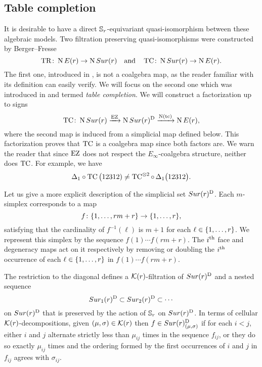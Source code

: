 
\subsection{Table completion}\label{ss:table completion}

It is desirable to have a direct $\mathbb{S}_r$-equivariant quasi-isomorphism between these algebraic models.
Two filtration preserving quasi-isomorphisms were constructed by Berger--Fresse
\[
\operatorname{TR} \colon \operatorname{N}E(r) \to \operatorname{N}Sur(r)
\quad \text{and} \quad
\operatorname{TC} \colon \operatorname{N}Sur(r) \to \operatorname{N} E(r).
\]
The first one, introduced in \cite[1$\cdot$3]{berger2004combinatorial}, is not a coalgebra map, as the reader familiar with its definition can easily verify.
We will focus on the second one which was introduced in \cite{berger2002prismatic} and termed \textit{table completion}.
We will construct a factorization up to signs
\[
\operatorname{TC} \colon \operatorname{N}Sur(r) \xrightarrow{\operatorname{EZ}} \operatorname{N}Sur(r)^{\mathrm{D}} \xrightarrow{\operatorname{N}(\operatorname{tc})} \operatorname{N} E(r),
\]
where the second map is induced from a simplicial map defined below.
This factorization proves that $\operatorname{TC}$ is a coalgebra map since both factors are.
We warn the reader that since $\operatorname{EZ}$ does not respect the $E_\infty$-coalgebra structure,
neither does $\operatorname{TC}$.
For example, we have
\[
\Delta_1 \circ \operatorname{TC}\big(12312) \neq \operatorname{TC}^{\otimes 2} \circ \, \Delta_1 \big(12312\big).
\]

Let us give a more explicit description of the simplicial set $Sur(r)^{\mathrm{D}}$.
Each $m$-simplex corresponds to a map
\[
f \colon \{1,\dots,rm+r\} \to \{1,\dots,r\},
\]
satisfying that the cardinality of $f^{-1}(\ell)$ is $m+1$ for each $\ell \in \{1,\dots,r\}$.
We represent this simplex by the sequence $f(1) \dotsb f(rm+r)$.
The $i^{\mathrm{th}}$ face and degeneracy maps act on it respectively by removing or doubling the $i^{\mathrm{th}}$ occurrence of each $\ell \in \{1,\dots,r\}$ in $f(1) \dotsb f(rm+r)$.

The restriction to the diagonal defines a $\mathcal{K}(r)$-filtration of $Sur(r)^{\mathrm{D}}$ and a nested sequence
\[
Sur_1(r)^{\mathrm{D}} \subset Sur_2(r)^{\mathrm{D}} \subset \dotsb
\]
on $Sur(r)^{\mathrm{D}}$ that is preserved by the action of $\mathbb{S}_r$ on $Sur(r)^{\mathrm{D}}$.
In terms of cellular $\mathcal{K}(r)$-decompositions, given $(\mu,\sigma) \in \mathcal{K}(r)$ then $f \in Sur(r)^{\mathrm{D}}_{(\mu,\sigma)}$ if for each $i<j$, either $i$ and $j$ alternate strictly less than $\mu_{ij}$ times in the sequence $f_{ij}$, or they do so exactly $\mu_{ij}$ times and the ordering formed by the first occurrences of $i$ and $j$ in $f_{ij}$ agrees with $\sigma_{ij}$.

